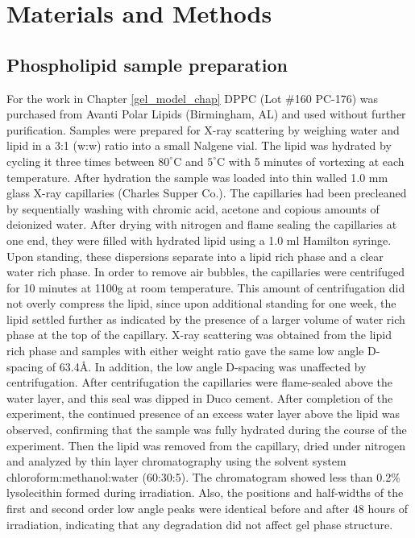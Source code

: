 \chapter{Materials and Methods}
\label{matmet_chap}

\section{Phospholipid sample preparation}

For the work in Chapter \ref{gel_model_chap} DPPC (Lot \#160 PC-176) 
was purchased from Avanti Polar Lipids (Birmingham, AL) and used
without further purification.  Samples were prepared for X-ray scattering
by weighing water and lipid in a 3:1 (w:w) ratio into a small Nalgene vial. 
The lipid was hydrated by 
cycling it three times between $80^{\circ}$C and $5^{\circ}$C with 5 minutes 
of vortexing at each temperature. After hydration the sample was loaded into 
thin walled 1.0 mm glass X-ray capillaries (Charles Supper Co.).  The 
capillaries had been precleaned by sequentially washing with chromic acid, 
acetone and copious amounts of deionized water. After drying with nitrogen 
and flame sealing the capillaries at one end, they were filled with hydrated 
lipid using a 1.0 ml Hamilton syringe. Upon standing, these dispersions 
separate into a lipid rich phase and a clear water rich phase.  
In order to remove air bubbles, the capillaries
were centrifuged for 10 minutes at 1100g at room temperature.
This amount of centrifugation did not overly compress the lipid, 
since upon additional standing for one week, the lipid settled 
further as indicated by the presence of a larger volume of water rich phase at
the top of the capillary.  X-ray scattering was obtained from the
lipid rich phase and samples with either weight ratio gave the same low 
angle D-spacing of 63.4\AA. In addition, the low angle D-spacing was 
unaffected by centrifugation. After centrifugation the capillaries were 
flame-sealed above the water layer, and this seal was dipped in Duco cement.  
After completion of the experiment, the continued presence of an excess
water layer above the lipid was observed, confirming that the sample was
fully hydrated during the course of the experiment. Then the lipid was 
removed from the capillary, dried under nitrogen and analyzed by thin layer 
chromatography using the solvent system chloroform:methanol:water (60:30:5).
The chromatogram showed less than 0.2\% lysolecithin formed during irradiation.
Also, the positions and half-widths of the first and second order low angle 
peaks were identical before and after 48 hours of irradiation, indicating 
that any degradation did not affect gel phase structure.

